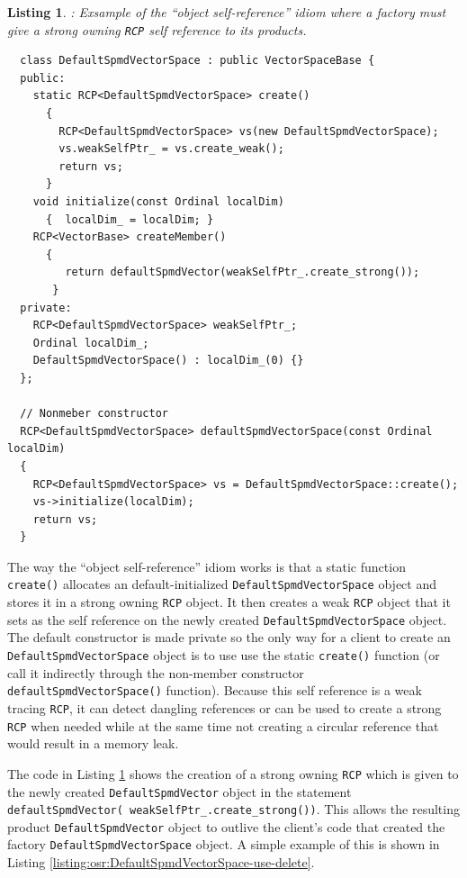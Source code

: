 \documentclass[pdf,ps2pdf,11pt]{SANDreport}
\newtheorem{listing}{Listing}
\begin{document}
\begin{listing}: Exsample of the ``object self-reference'' idiom where a
factory must give a strong owning {}\texttt{RCP} self reference to its products.  \\
\label{listing:osr:DefaultSpmdVectorSpace}
{\small\begin{verbatim}
  class DefaultSpmdVectorSpace : public VectorSpaceBase {
  public:
    static RCP<DefaultSpmdVectorSpace> create()
      {
        RCP<DefaultSpmdVectorSpace> vs(new DefaultSpmdVectorSpace);
        vs.weakSelfPtr_ = vs.create_weak();
        return vs;
      }
    void initialize(const Ordinal localDim)
      {  localDim_ = localDim; }
    RCP<VectorBase> createMember()
      {
         return defaultSpmdVector(weakSelfPtr_.create_strong());
       }
  private:
    RCP<DefaultSpmdVectorSpace> weakSelfPtr_;
    Ordinal localDim_;
    DefaultSpmdVectorSpace() : localDim_(0) {}
  };

  // Nonmeber constructor
  RCP<DefaultSpmdVectorSpace> defaultSpmdVectorSpace(const Ordinal localDim)
  {
    RCP<DefaultSpmdVectorSpace> vs = DefaultSpmdVectorSpace::create();
    vs->initialize(localDim);
    return vs;
  }
\end{verbatim}}
\end{listing}


The way the ``object self-reference'' idiom works is that a static
function {}\texttt{create()} allocates an default-initialized
{}\texttt{DefaultSpmdVectorSpace} object and stores it in a strong
owning {}\texttt{RCP} object.  It then creates a weak {}\texttt{RCP}
object that it sets as the self reference on the newly created
{}\texttt{DefaultSpmdVectorSpace} object.  The default constructor is
made private so the only way for a client to create an
{}\texttt{DefaultSpmdVectorSpace} object is to use use the static
{}\texttt{create()} function (or call it indirectly through the
non-member constructor {}\texttt{defaultSpmdVectorSpace()} function).
Because this self reference is a weak tracing {}\texttt{RCP}, it can
detect dangling references or can be used to create a strong
{}\texttt{RCP} when needed while at the same time not creating a
circular reference that would result in a memory leak.

The code in Listing {}\ref{listing:osr:DefaultSpmdVectorSpace} shows
the creation of a strong owning {}\texttt{RCP} which is given to the
newly created {}\texttt{DefaultSpmdVector} object in the statement
{}\texttt{defaultSpmdVector( weakSelfPtr\_.create\_strong())}.  This
allows the resulting product {}\texttt{DefaultSpmdVector} object to
outlive the client's code that created the factory
{}\texttt{DefaultSpmdVectorSpace} object.  A simple example of this is
shown in Listing
{}\ref{listing:osr:DefaultSpmdVectorSpace-use-delete}.
\end{document}
